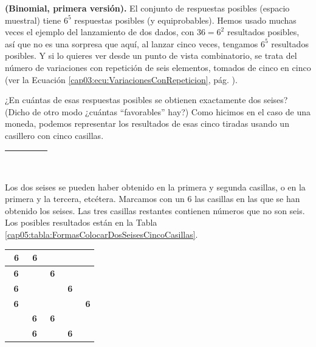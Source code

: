 \begin{Ejemplo}{\bf (Binomial, primera versión).}
\label{ejem:BinomialDosSeisesCuatroTiradas}
    El conjunto de respuestas posibles (espacio muestral) tiene $6^5$ respuestas posibles (y equiprobables). Hemos usado muchas veces el ejemplo del lanzamiento de dos dados, con $36=6^2$ resultados posibles, así que no es una sorpresa que aquí, al lanzar cinco veces, tengamos $6^5$ resultados posibles. Y si lo quieres ver desde un punto de vista combinatorio, se trata del número de variaciones con repetición de seis elementos, tomados de cinco en cinco (ver la Ecuación \ref{cap03:ecu:VariacionesConRepeticion}, pág. \pageref{cap03:ecu:VariacionesConRepeticion}).

    ¿En cuántas de esas respuestas posibles se obtienen exactamente dos seises? (Dicho de otro modo ¿cuántas ``favorables'' hay?) Como hicimos en el caso de una moneda, podemos representar los resultados de esas cinco tiradas usando un casillero con cinco casillas.
    \begin{center}
    \begin{tabular}{|c|c|c|c|c|}
    \hline
    \rule{0cm}{0.5cm}\rule{0.3cm}{0cm}&\rule{0.3cm}{0cm}&\rule{0.3cm}{0cm} &\rule{0.3cm}{0cm}&\rule{0.3cm}{0cm}\\
    \hline
    \end{tabular}
    \end{center}
    Los dos seises se pueden haber obtenido en la primera y segunda casillas, o en la primera y la tercera, etcétera. Marcamos con un $6$ las casillas en las que se han obtenido los seises. Las tres casillas restantes contienen números que no son seis. Los posibles resultados están en la Tabla \ref{cap05:tabla:FormasColocarDosSeisesCincoCasillas}.
        \begin{table}[ht]
        \begin{center}
        {
        \begin{tabular}{|c|c|c|c|c|}
        \hline
         \mbox{ \bf 6}&\mbox{ \bf 6}& & & \\
        \hline
         \mbox{ \bf 6}&& \mbox{ \bf 6}& & \\
        \hline
         \mbox{ \bf 6}&& &\mbox{ \bf 6} & \\
        \hline
         \mbox{ \bf 6}&& & &\mbox{ \bf 6} \\
        \hline
         &\mbox{ \bf 6}& \mbox{ \bf 6}& & \\
        \hline
         &\mbox{ \bf 6}& &\mbox{ \bf 6} & \\
        \hline

\end{tabular}}
\end{center}
\end{table}
\end{Ejemplo}
